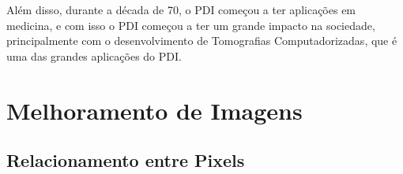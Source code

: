\documentclass[12pt]{article}
\begin{document}
Além disso, durante a década de 70, o PDI começou a ter aplicações em medicina, e com isso o PDI
começou a ter um grande impacto na sociedade, principalmente com o desenvolvimento de Tomografias
Computadorizadas, que é uma das grandes aplicações do PDI.



\newpage

\section{Melhoramento de Imagens}

\subsection{Relacionamento entre Pixels}
\end{document}
